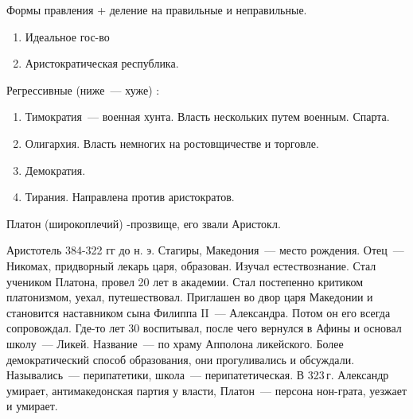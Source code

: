 Формы правления + деление на правильные и неправильные. 

\begin{enumerate}
	\item Идеальное гос-во
	\item Аристократическая республика.
\end{enumerate}

Регрессивные (ниже~--- хуже) :

\begin{enumerate}
	\item Тимократия~--- военная хунта. Власть нескольких путем военным. Спарта. 
	\item Олигархия. Власть немногих на ростовщичестве и торговле. 
	\item Демократия. 
	\item Тирания. Направлена против аристократов. 
\end{enumerate}

Платон (широкоплечий) -прозвище, его звали Аристокл. 

Аристотель
384-322 гг до н. э. 
Стагиры, Македония~--- место рождения. Отец~--- Никомах, придворный лекарь царя, образован. 
Изучал естествознание. Стал учеником Платона, провел 20 лет в академии. Стал постепенно критиком платонизмом, уехал, путешествовал. Приглашен во двор царя Македонии и становится наставником сына Филиппа II~--- Александра. 
Потом он его всегда сопровождал. Где-то лет 30 воспитывал, после чего вернулся в Афины и основал школу~--- Ликей. 
Название~--- по храму Апполона ликейского. Более демократический способ образования, они прогуливались и обсуждали. 
Назывались~--- перипатетики, школа~--- перипатетическая. В 323\,г. Александр умирает, антимакедонская партия у власти, Платон~--- персона нон-грата, уезжает и умирает. 
 